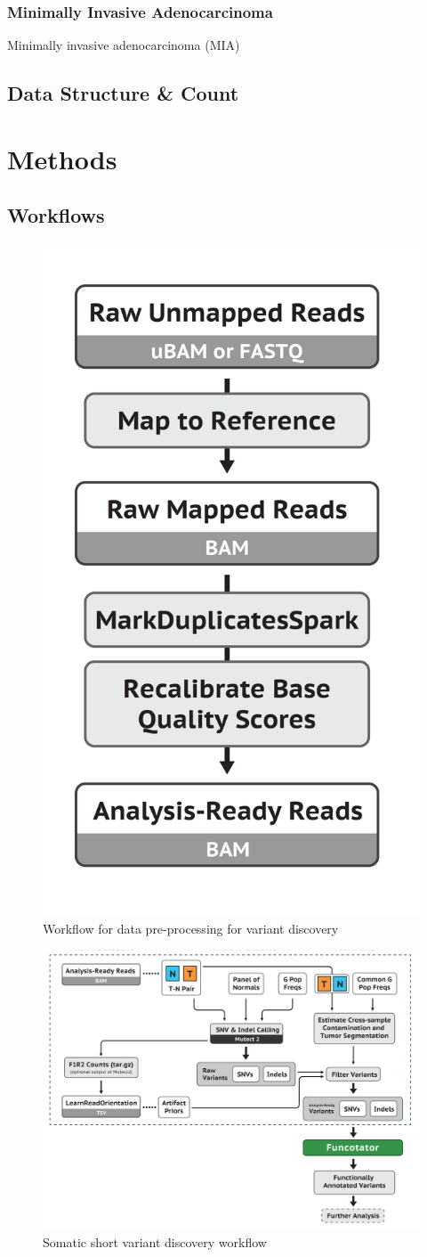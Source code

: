 \documentclass[a4paper]{article}
\begin{document}
            \subsubsection{Minimally Invasive Adenocarcinoma}
                Minimally invasive adenocarcinoma (MIA)

        \subsection{Data Structure \& Count}

    \section{Methods}
        \subsection{Workflows}

            \begin{figure}[p]
                \centering
                \includegraphics[width=0.3 \linewidth]{figures/Workflow/mapping.png}
                \caption{Workflow for data pre-processing for variant discovery \protect\cite{gatk1, gatk2}}
                \label{fig:workflow-preprocessing}
            \end{figure}

            \begin{figure}[p]
                \centering
                \includegraphics[width=0.8 \linewidth]{figures/Workflow/somatic_short_variants.png}
                \caption{Somatic short variant discovery workflow \protect\cite{gatk1, gatk2}}
                \label{fig:workflow-somatic}
            \end{figure}
\end{document}
